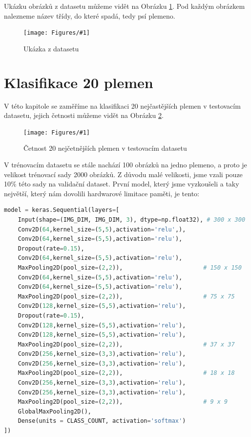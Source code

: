 \documentclass[a4paper,12pt]{article}
\newcommand{\image}[4]{\begin{figure}[ht!] \centering \texttt{[image: Figures/\#1]} \caption{#2} \label{#3} \end{figure}}
\begin{document}
Ukázku obrázků z datasetu můžeme vidět na Obrázku \ref{fig:dataset_example}. Pod každým obrázkem nalezneme název třídy, do které spadá, tedy psí plemeno.
\image{datasat_example.pdf}{Ukázka z datasetu}{fig:dataset_example}{1.0}

\newpage
\section{Klasifikace 20 plemen}
V této kapitole se zaměříme na klasifikaci 20 nejčastějších plemen v testovacím datasetu, jejich četnosti můžeme vidět na Obrázku \ref{fig:t20_test_dist}.

\image{t20_test_breeds.pdf}{Četnost 20 nejčetnějších plemen v testovacím datasetu}{fig:t20_test_dist}{1}

V trénovacím datasetu se stále nachází 100 obrázků na jedno plemeno, a proto je velikost trénovací sady 2000 obrázků. Z důvodu malé velikosti, jsme vzali pouze 10\% této sady na validační dataset. První model, který jsme vyzkoušeli a taky největší, který nám dovolili hardwarové limitace paměti, je tento:
\begin{lstlisting}[language=Python]
model = keras.Sequential(layers=[
    Input(shape=(IMG_DIM, IMG_DIM, 3), dtype=np.float32), # 300 x 300
    Conv2D(64,kernel_size=(5,5),activation='relu',),
    Conv2D(64,kernel_size=(5,5),activation='relu'),
    Dropout(rate=0.15),
    Conv2D(64,kernel_size=(5,5),activation='relu'),       
    MaxPooling2D(pool_size=(2,2)),                       # 150 x 150  
    Conv2D(64,kernel_size=(5,5),activation='relu'),
    Conv2D(64,kernel_size=(5,5),activation='relu'),
    MaxPooling2D(pool_size=(2,2)),                       # 75 x 75
    Conv2D(128,kernel_size=(5,5),activation='relu'),
    Dropout(rate=0.15),
    Conv2D(128,kernel_size=(5,5),activation='relu'),
    Conv2D(128,kernel_size=(5,5),activation='relu'),
    MaxPooling2D(pool_size=(2,2)),                       # 37 x 37  
    Conv2D(256,kernel_size=(3,3),activation='relu'),
    Conv2D(256,kernel_size=(3,3),activation='relu'),
    MaxPooling2D(pool_size=(2,2)),                       # 18 x 18
    Conv2D(256,kernel_size=(3,3),activation='relu'),
    Conv2D(256,kernel_size=(3,3),activation='relu'),
    MaxPooling2D(pool_size=(2,2)),                       # 9 x 9
    GlobalMaxPooling2D(),
    Dense(units = CLASS_COUNT, activation='softmax')
])
\end{lstlisting}
\end{document}
